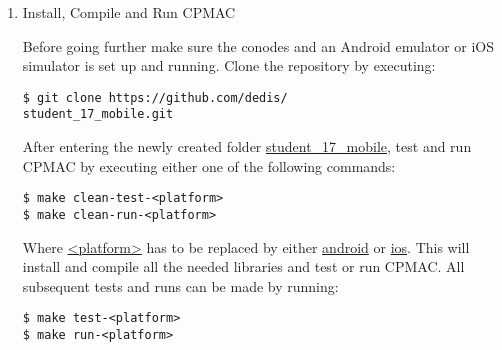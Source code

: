 \begin{enumerate}
\item Install, Compile and Run CPMAC

Before going further make sure the conodes and an Android emulator or iOS simulator is set up and running. Clone the repository by executing:
\begin{lstlisting}
$ git clone https://github.com/dedis/
student_17_mobile.git
\end{lstlisting}
After entering the newly created folder \url{student_17_mobile}, test and run CPMAC by executing either one of the following commands:
\begin{lstlisting}
$ make clean-test-<platform>
$ make clean-run-<platform>
\end{lstlisting}
Where \url{<platform>} has to be replaced by either \url{android} or \url{ios}. This will install and compile all the needed libraries and test or run CPMAC. All subsequent tests and runs can be made by running:
\begin{lstlisting}
$ make test-<platform>
$ make run-<platform>
\end{lstlisting}
\end{enumerate}
